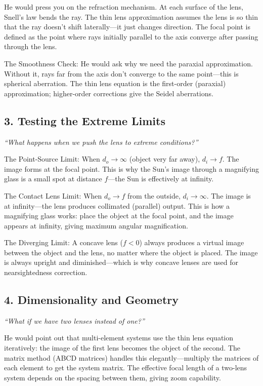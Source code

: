He would press you on the refraction mechanism. At each surface of the lens, Snell's law bends the ray. The thin lens approximation assumes the lens is so thin that the ray doesn't shift laterally---it just changes direction. The focal point is defined as the point where rays initially parallel to the axis converge after passing through the lens.

The Smoothness Check: He would ask why we need the paraxial approximation. Without it, rays far from the axis don't converge to the same point---this is spherical aberration. The thin lens equation is the first-order (paraxial) approximation; higher-order corrections give the Seidel aberrations.

\subsection*{3. Testing the Extreme Limits}
\textit{``What happens when we push the lens to extreme conditions?''}

The Point-Source Limit: When $d_o \to \infty$ (object very far away), $d_i \to f$. The image forms at the focal point. This is why the Sun's image through a magnifying glass is a small spot at distance $f$---the Sun is effectively at infinity.

The Contact Lens Limit: When $d_o \to f$ from the outside, $d_i \to \infty$. The image is at infinity---the lens produces collimated (parallel) output. This is how a magnifying glass works: place the object at the focal point, and the image appears at infinity, giving maximum angular magnification.

The Diverging Limit: A concave lens ($f < 0$) always produces a virtual image between the object and the lens, no matter where the object is placed. The image is always upright and diminished---which is why concave lenses are used for nearsightedness correction.

\subsection*{4. Dimensionality and Geometry}
\textit{``What if we have two lenses instead of one?''}

He would point out that multi-element systems use the thin lens equation iteratively: the image of the first lens becomes the object of the second. The matrix method (ABCD matrices) handles this elegantly---multiply the matrices of each element to get the system matrix. The effective focal length of a two-lens system depends on the spacing between them, giving zoom capability.

